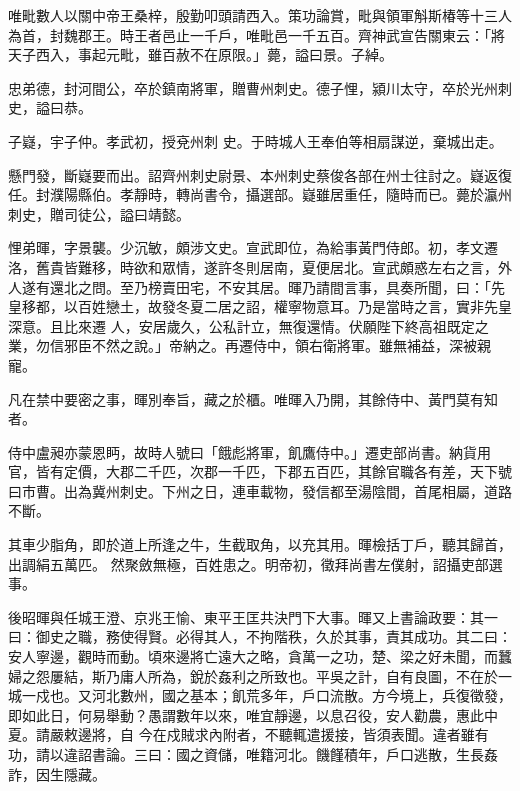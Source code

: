 \begin{pinyinscope}
 唯毗數人以關中帝王桑梓，殷勤叩頭請西入。策功論賞，毗與領軍斛斯椿等十三人為首，封魏郡王。時王者邑止一千戶，唯毗邑一千五百。齊神武宣告關東云：「將天子西入，事起元毗，雖百赦不在原限。」薨，謚曰景。子綽。



 忠弟德，封河間公，卒於鎮南將軍，贈曹州刺史。德子悝，潁川太守，卒於光州刺史，謚曰恭。



 子嶷，宇子仲。孝武初，授兗州刺
 史。于時城人王奉伯等相扇謀逆，棄城出走。



 懸門發，斷嶷要而出。詔齊州刺史尉景、本州刺史蔡俊各部在州士往討之。嶷返復任。封濮陽縣伯。孝靜時，轉尚書令，攝選部。嶷雖居重任，隨時而已。薨於瀛州刺史，贈司徒公，謚曰靖懿。



 悝弟暉，字景襲。少沉敏，頗涉文史。宣武即位，為給事黃門侍郎。初，孝文遷洛，舊貴皆難移，時欲和眾情，遂許冬則居南，夏便居北。宣武頗惑左右之言，外人遂有還北之問。至乃榜賣田宅，不安其居。暉乃請間言事，具奏所聞，曰：「先皇移都，以百姓戀土，故發冬夏二居之詔，權寧物意耳。乃是當時之言，實非先皇深意。且比來遷
 人，安居歲久，公私計立，無復還情。伏願陛下終高祖既定之業，勿信邪臣不然之說。」帝納之。再遷侍中，領右衛將軍。雖無補益，深被親寵。



 凡在禁中要密之事，暉別奉旨，藏之於櫃。唯暉入乃開，其餘侍中、黃門莫有知者。



 侍中盧昶亦蒙恩眄，故時人號曰「餓彪將軍，飢鷹侍中。」遷吏部尚書。納貨用官，皆有定價，大郡二千匹，次郡一千匹，下郡五百匹，其餘官職各有差，天下號曰市曹。出為冀州刺史。下州之日，連車載物，發信都至湯陰間，首尾相屬，道路不斷。



 其車少脂角，即於道上所逢之牛，生截取角，以充其用。暉檢括丁戶，聽其歸首，出調絹五萬匹。
 然聚斂無極，百姓患之。明帝初，徵拜尚書左僕射，詔攝吏部選事。



 後昭暉與任城王澄、京兆王愉、東平王匡共決門下大事。暉又上書論政要：其一曰：御史之職，務使得賢。必得其人，不拘階秩，久於其事，責其成功。其二曰：安人寧邊，觀時而動。頃來邊將亡遠大之略，貪萬一之功，楚、梁之好未聞，而蠶婦之怨屢結，斯乃庸人所為，銳於姦利之所致也。平吳之計，自有良圖，不在於一城一戍也。又河北數州，國之基本；飢荒多年，戶口流散。方今境上，兵復徵發，即如此日，何易舉動？愚謂數年以來，唯宜靜邊，以息召役，安人勸農，惠此中夏。請嚴敕邊將，自
 今在戍賊求內附者，不聽輒遣援接，皆須表聞。違者雖有功，請以違詔書論。三曰：國之資儲，唯籍河北。饑饉積年，戶口逃散，生長姦詐，因生隱藏。




\end{pinyinscope}
